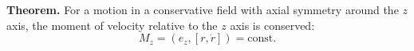 \textbf{Theorem.} For a motion in a conservative field with axial symmetry around the $z$ axis, the moment of velocity relative to the $z$ axis is conserved:
$$M_z = (e_z, [r, \dot{r}]) = \text{const}.$$
